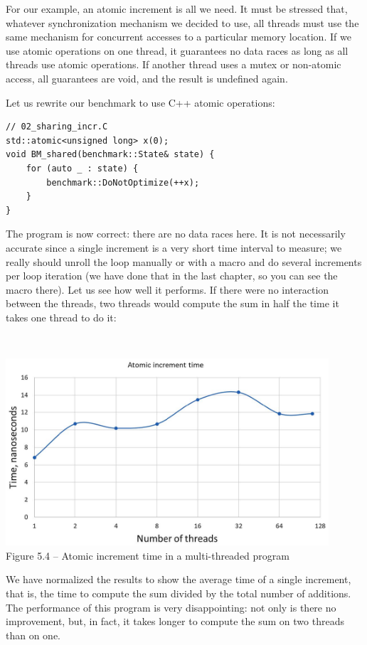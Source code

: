 For our example, an atomic increment is all we need. It must be stressed that, whatever synchronization mechanism we decided to use, all threads must use the same mechanism for concurrent accesses to a particular memory location. If we use atomic operations on one thread, it guarantees no data races as long as all threads use atomic operations. If another thread uses a mutex or non-atomic access, all guarantees are void, and the result is undefined again.

Let us rewrite our benchmark to use C++ atomic operations:

\begin{lstlisting}[style=styleCXX]
// 02_sharing_incr.C
std::atomic<unsigned long> x(0);
void BM_shared(benchmark::State& state) {
	for (auto _ : state) {
		benchmark::DoNotOptimize(++x);
	}
}
\end{lstlisting}

The program is now correct: there are no data races here. It is not necessarily accurate since a single increment is a very short time interval to measure; we really should unroll the loop manually or with a macro and do several increments per loop iteration (we have done that in the last chapter, so you can see the macro there). Let us see how well it performs. If there were no interaction between the threads, two threads would compute the sum in half the time it takes one thread to do it:

\hspace*{\fill} \\ %
\begin{center}
\includegraphics[width=0.9\textwidth]{content/1/chapter5/images/4.jpg}\\
Figure 5.4 – Atomic increment time in a multi-threaded program
\end{center}

We have normalized the results to show the average time of a single increment, that is, the time to compute the sum divided by the total number of additions. The performance of this program is very disappointing: not only is there no improvement, but, in fact, it takes longer to compute the sum on two threads than on one.

